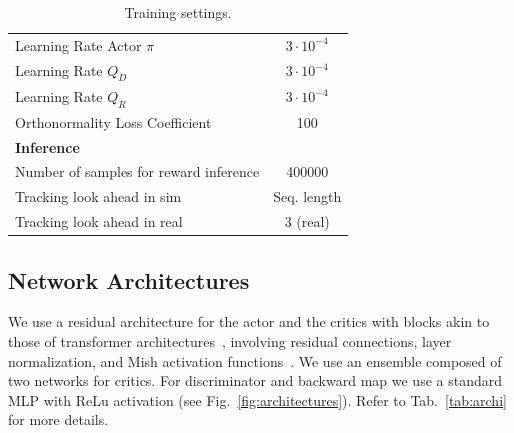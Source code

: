 \begin{table}[h]
\begin{tabular}{lc}
    Learning Rate Actor $\pi$            & $3 \cdot 10^{-4}$ \\
    Learning Rate $Q_D$                  & $3 \cdot 10^{-4}$ \\
    Learning Rate $Q_R$                  & $3 \cdot 10^{-4}$ \\
    Orthonormality Loss Coefficient      & 100 \\
    \midrule
    \multicolumn{2}{l}{\textbf{Inference}} \\
    \midrule
    Number of samples for reward inference      & 400000 \\
    Tracking look ahead in sim & Seq. length\\
    Tracking look ahead in real& 3 (real)\\
    \bottomrule
    \end{tabular}
    \caption{Training settings.}
    \label{tab:params}
\end{table}


\subsection{Network Architectures}
We use a residual architecture for the actor and the critics with blocks akin to those of transformer architectures~\citep{VaswaniSPUJGKP17}, involving residual connections, layer
normalization, and Mish activation functions~\citep{Misra20}. We use an ensemble composed of two networks for critics. For discriminator and backward map we use a standard MLP with ReLu activation (see Fig.~\ref{fig:architectures}). Refer to Tab.~\ref{tab:archi} for more details.

